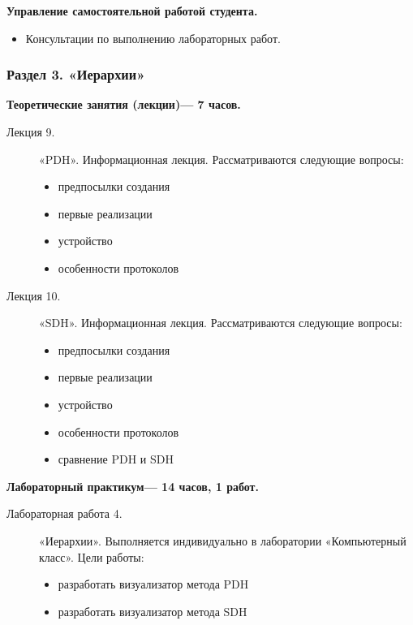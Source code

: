 \begin{center}
{\textbf{Управление самостоятельной работой студента.}
\begin{itemize}
\item Консультации по выполнению лабораторных работ.
\end{itemize}
}


\subsubsection{Раздел 3. «Иерархии»}

{\parindent0pt

\textbf{Теоретические занятия (лекции)— 7 часов.}
\begin{description}
\item[Лекция 9.] «PDH». Информационная лекция. Рассматриваются следующие вопросы: \begin{itemize}
\item предпосылки создания\item первые реализации\item устройство\item особенности протоколов
\end{itemize}\item[Лекция 10.] «SDH». Информационная лекция. Рассматриваются следующие вопросы: \begin{itemize}
\item предпосылки создания\item первые реализации\item устройство\item особенности протоколов\item сравнение PDH и SDH
\end{itemize}
\end{description}




\textbf{Лабораторный практикум— 14 часов, 1 работ.}
\begin{description}
\item[Лабораторная работа 4.] «Иерархии». Выполняется индивидуально в лаборатории «Компьютерный класс». Цели работы: \begin{itemize}
\item разработать визуализатор метода PDH\item разработать визуализатор метода SDH
\end{itemize}
\end{description}

}
\end{center}
